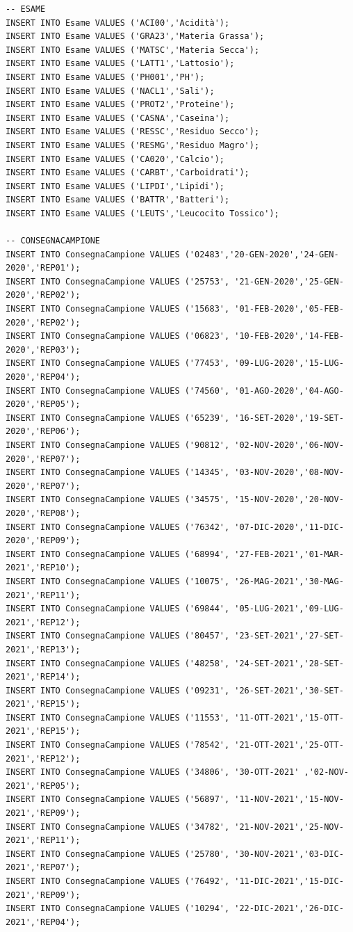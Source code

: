 \documentclass[12pt]{report}
\begin{document}
\begin{scriptsize}
\begin{verbatim}
-- ESAME
INSERT INTO Esame VALUES ('ACI00','Acidità');
INSERT INTO Esame VALUES ('GRA23','Materia Grassa');
INSERT INTO Esame VALUES ('MATSC','Materia Secca');
INSERT INTO Esame VALUES ('LATT1','Lattosio');
INSERT INTO Esame VALUES ('PH001','PH');
INSERT INTO Esame VALUES ('NACL1','Sali');
INSERT INTO Esame VALUES ('PROT2','Proteine');
INSERT INTO Esame VALUES ('CASNA','Caseina');
INSERT INTO Esame VALUES ('RESSC','Residuo Secco');
INSERT INTO Esame VALUES ('RESMG','Residuo Magro');
INSERT INTO Esame VALUES ('CA020','Calcio');
INSERT INTO Esame VALUES ('CARBT','Carboidrati');
INSERT INTO Esame VALUES ('LIPDI','Lipidi');
INSERT INTO Esame VALUES ('BATTR','Batteri');
INSERT INTO Esame VALUES ('LEUTS','Leucocito Tossico');

-- CONSEGNACAMPIONE
INSERT INTO ConsegnaCampione VALUES ('02483','20-GEN-2020','24-GEN-2020','REP01');
INSERT INTO ConsegnaCampione VALUES ('25753', '21-GEN-2020','25-GEN-2020','REP02');
INSERT INTO ConsegnaCampione VALUES ('15683', '01-FEB-2020','05-FEB-2020','REP02');
INSERT INTO ConsegnaCampione VALUES ('06823', '10-FEB-2020','14-FEB-2020','REP03');
INSERT INTO ConsegnaCampione VALUES ('77453', '09-LUG-2020','15-LUG-2020','REP04');
INSERT INTO ConsegnaCampione VALUES ('74560', '01-AGO-2020','04-AGO-2020','REP05');
INSERT INTO ConsegnaCampione VALUES ('65239', '16-SET-2020','19-SET-2020','REP06');
INSERT INTO ConsegnaCampione VALUES ('90812', '02-NOV-2020','06-NOV-2020','REP07');
INSERT INTO ConsegnaCampione VALUES ('14345', '03-NOV-2020','08-NOV-2020','REP07');
INSERT INTO ConsegnaCampione VALUES ('34575', '15-NOV-2020','20-NOV-2020','REP08');
INSERT INTO ConsegnaCampione VALUES ('76342', '07-DIC-2020','11-DIC-2020','REP09');
INSERT INTO ConsegnaCampione VALUES ('68994', '27-FEB-2021','01-MAR-2021','REP10');
INSERT INTO ConsegnaCampione VALUES ('10075', '26-MAG-2021','30-MAG-2021','REP11');
INSERT INTO ConsegnaCampione VALUES ('69844', '05-LUG-2021','09-LUG-2021','REP12');
INSERT INTO ConsegnaCampione VALUES ('80457', '23-SET-2021','27-SET-2021','REP13');
INSERT INTO ConsegnaCampione VALUES ('48258', '24-SET-2021','28-SET-2021','REP14');
INSERT INTO ConsegnaCampione VALUES ('09231', '26-SET-2021','30-SET-2021','REP15');
INSERT INTO ConsegnaCampione VALUES ('11553', '11-OTT-2021','15-OTT-2021','REP15');
INSERT INTO ConsegnaCampione VALUES ('78542', '21-OTT-2021','25-OTT-2021','REP12');
INSERT INTO ConsegnaCampione VALUES ('34806', '30-OTT-2021' ,'02-NOV-2021','REP05');
INSERT INTO ConsegnaCampione VALUES ('56897', '11-NOV-2021','15-NOV-2021','REP09');
INSERT INTO ConsegnaCampione VALUES ('34782', '21-NOV-2021','25-NOV-2021','REP11');
INSERT INTO ConsegnaCampione VALUES ('25780', '30-NOV-2021','03-DIC-2021','REP07');
INSERT INTO ConsegnaCampione VALUES ('76492', '11-DIC-2021','15-DIC-2021','REP09');
INSERT INTO ConsegnaCampione VALUES ('10294', '22-DIC-2021','26-DIC-2021','REP04');


\end{verbatim}
\end{scriptsize}
\end{document}
